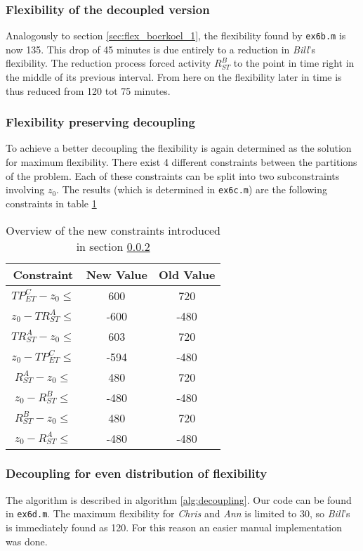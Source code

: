 \documentclass[10pt,a4paper]{article}
\begin{document}
\subsubsection{Flexibility of the decoupled version}
Analogously to section \ref{sec:flex_boerkoel_1}, the flexibility found by \texttt{ex6b.m} is now 135. This drop of 45 minutes is due entirely to a reduction in \emph{Bill}'s flexibility. The reduction process forced activity $R^{B}_{ST}$ to the point in time right in the middle of its previous interval. From here on the flexibility later in time is thus reduced from 120 tot 75 minutes.

\subsubsection{Flexibility preserving decoupling}
\label{sec:preserving_decoupling}
To achieve a better decoupling the flexibility is again determined as the solution for maximum flexibility. There exist 4 different constraints between the partitions of the problem. Each of these constraints can be split into two subconstraints involving $z_0$. The results (which is determined in \texttt{ex6c.m}) are the following constraints in table \ref{table:constraints}

\begin{table}
\centering
\begin{tabular}{ c | c | c }
Constraint & New Value & Old Value \\ \hline
$TP^C_{ET} - z_0 \leq $ & 600 & 720 \\
$z_0 - TR^A_{ST}\leq $ & -600 & -480 \\
$TR^A_{ST} - z_0\leq $ & 603 & 720 \\
$z_0 - TP^C_{ET}\leq $ & -594 & -480 \\
$R^A_{ST} - z_0 \leq $ & 480 & 720 \\
$z_0 - R^B_{ST} \leq $ & -480 & -480 \\
$R^B_{ST} - z_0\leq $ & 480 & 720 \\
$z_0 - R^A_{ST} \leq $ & -480 & -480
\end{tabular}
\caption{Overview of the new constraints introduced in section \ref{sec:preserving_decoupling}}
\label{table:constraints}
\end{table}

\subsubsection{Decoupling for even distribution of flexibility}
The algorithm is described in algorithm \ref{alg:decoupling}. Our code can be found in \texttt{ex6d.m}. The maximum flexibility for \emph{Chris} and \emph{Ann} is limited to 30, so \emph{Bill}'s is immediately found as 120. For this reason an easier manual implementation was done.
\end{document}
